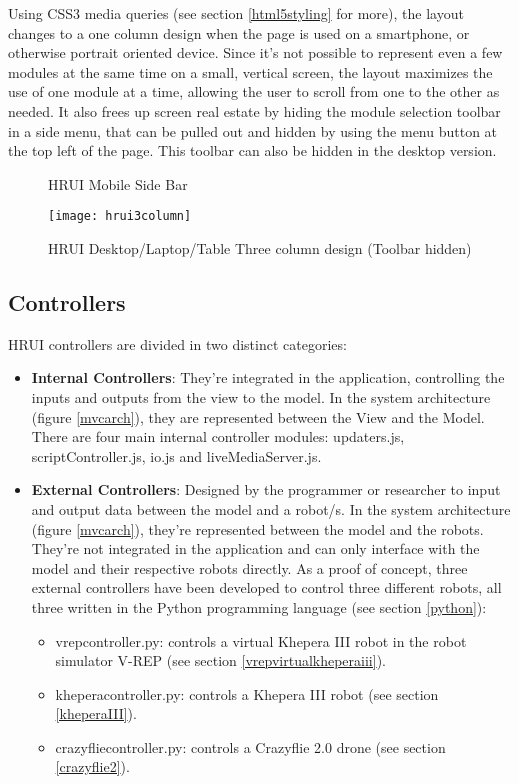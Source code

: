 Using CSS3 media queries (see section \ref{html5styling} for more), the layout changes to a one column design when the page 
is used on a smartphone, or otherwise portrait oriented device. Since it's not possible to represent even a few modules at 
the same time on a small, vertical screen, the layout maximizes the use of one module at a time, allowing the user to 
scroll from one to the other as needed. It also frees up screen real estate by hiding the module selection toolbar in a 
side menu, that can be pulled out and hidden by using the menu button at the top left of the page. This toolbar can also be 
hidden in the desktop version.
\begin{figure}[H]
\centering
{}
\caption{HRUI Mobile Side Bar}
\end{figure}
\begin{figure}[H]
\centering
\texttt{[image: hrui3column]}
\caption{HRUI Desktop/Laptop/Table Three column design (Toolbar hidden)}
\end{figure}
\subsection{Controllers}
HRUI controllers are divided in two distinct categories:
\begin{itemize}
	\item \textbf{Internal Controllers}: They're integrated in the application, controlling the inputs and outputs from the 
	view to the model. In the system architecture (figure \ref{mvcarch}), they are represented between the View and the 
	Model. There are four main internal controller modules: updaters.js, scriptController.js, io.js and liveMediaServer.js.
	\item \textbf{External Controllers}: Designed by the programmer or researcher to input and output data between the 
	model and a robot/s. In the system architecture (figure \ref{mvcarch}), they're represented between the model and the 
	robots. They're not integrated in the application and can only interface with the model and their respective robots 
	directly. As a proof of concept, three external controllers have been developed to control three different robots, all 
	three written in the Python programming language (see section \ref{python}): 
	\begin{itemize}
		\item vrepcontroller.py: controls a virtual Khepera III robot in the robot simulator V-REP (see section 
		\ref{vrepvirtualkheperaiii}).
		\item kheperacontroller.py: controls a Khepera III robot (see section \ref{kheperaIII}).
		\item crazyfliecontroller.py: controls a Crazyflie 2.0 drone (see section \ref{crazyflie2}).
	\end{itemize}
\end{itemize}
